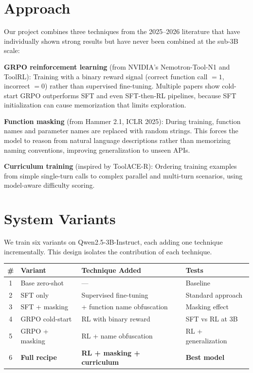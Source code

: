 \documentclass[11pt, letterpaper]{article}
\begin{document}
\section*{Approach}

Our project combines three techniques from the 2025--2026 literature that have individually shown strong results but have never been combined at the sub-3B scale:

\textbf{GRPO reinforcement learning} (from NVIDIA's Nemotron-Tool-N1 and ToolRL): Training with a binary reward signal (correct function call $= 1$, incorrect $= 0$) rather than supervised fine-tuning. Multiple papers show cold-start GRPO outperforms SFT and even SFT-then-RL pipelines, because SFT initialization can cause memorization that limits exploration.

\textbf{Function masking} (from Hammer 2.1, ICLR 2025): During training, function names and parameter names are replaced with random strings. This forces the model to reason from natural language descriptions rather than memorizing naming conventions, improving generalization to unseen APIs.

\textbf{Curriculum training} (inspired by ToolACE-R): Ordering training examples from simple single-turn calls to complex parallel and multi-turn scenarios, using model-aware difficulty scoring.

\section*{System Variants}

We train six variants on Qwen2.5-3B-Instruct, each adding one technique incrementally. This design isolates the contribution of each technique.

\begin{table}[h]
\centering
\small
\begin{tabular}{@{}clll@{}}
\toprule
\textbf{\#} & \textbf{Variant} & \textbf{Technique Added} & \textbf{Tests} \\
\midrule
1 & Base zero-shot & --- & Baseline \\
2 & SFT only & Supervised fine-tuning & Standard approach \\
3 & SFT + masking & + function name obfuscation & Masking effect \\
4 & GRPO cold-start & RL with binary reward & SFT vs RL at 3B \\
5 & GRPO + masking & RL + name obfuscation & RL + generalization \\
6 & \textbf{Full recipe} & \textbf{RL + masking + curriculum} & \textbf{Best model} \\
\bottomrule
\end{tabular}
\end{table}
\end{document}
